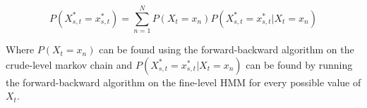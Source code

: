 $$P(X^*_{s,t} = x^*_{s,t}) = \sum_{n=1}^N P(X_t = x_n)P(X^*_{s,t} = x^*_{s,t} | X_t = x_n)$$

Where $P(X_t = x_n)$ can be found using the forward-backward algorithm on the crude-level markov chain and $P(X^*_{s,t} = x^*_{s,t} | X_t = x_n)$ can be found by running the forward-backward algorithm on the fine-level HMM for every possible value of $X_t$.